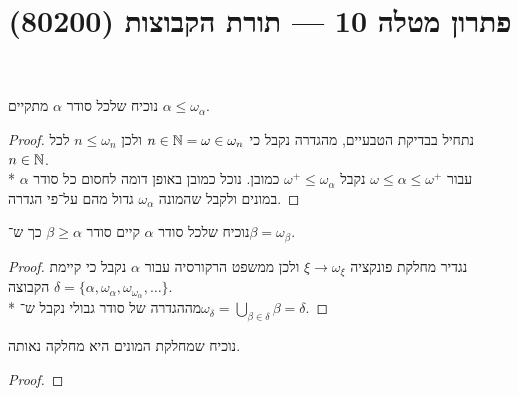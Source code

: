 
\title{פתרון מטלה 10 --- תורת הקבוצות (80200)}

\DeclareMathOperator\dom{dom}
\DeclareMathOperator\add{Add}
\DeclareMathOperator\mult{Mult}

\maketitle
\maketitleprint{}

\Question{}
נוכיח שלכל סודר $\alpha$ מתקיים $\alpha \le \omega_\alpha$.
\begin{proof}
	נתחיל בבדיקת הטבעיים, מהגדרה נקבל כי $n \in \mathbb{N} = \omega \in \omega_n$ ולכן $n \le \omega_n$ לכל $n \in \mathbb{N}$. \\*
	עבור $\omega \le \alpha \le \omega^+$ נקבל $\omega^+ \le \omega_\alpha$ כמובן.
	נוכל כמובן באופן דומה לחסום כל סודר $\alpha$ במונים ולקבל שהמונה $\omega_\alpha$ גדול מהם על־פי הגדרה.
\end{proof}

\Question{}
נוכיח שלכל סודר $\alpha$ קיים סודר $\beta \ge \alpha$ כך ש־$\beta = \omega_\beta$.
\begin{proof}
	נגדיר מחלקת פונקציה $\xi \to \omega_\xi$ ולכן ממשפט הרקורסיה עבור $\alpha$ נקבל כי קיימת הקבוצה $\delta = \{ \alpha, \omega_\alpha, \omega_{\omega_\alpha}, \dots \}$. \\*
	מההגדרה של סודר גבולי נקבל ש־$\omega_\delta = \bigcup_{\beta \in \delta} \beta = \delta$.
\end{proof}

\Question{}
נוכיח שמחלקת המונים היא מחלקה נאותה.
\begin{proof}
	
\end{proof}


